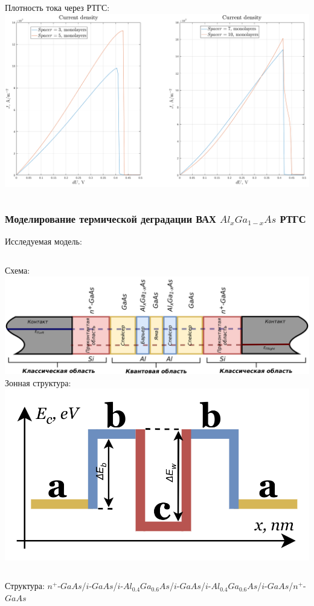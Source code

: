 \documentclass[10pt,pdf,hyperref={unicode},aspectratio={169}]{beamer}
\begin{document}
\begin{frame}
\begin{columns}
		{\color{red} Плотность тока через РТГС:}
	   	\includegraphics[width=.8\linewidth,center]{assets/qslqj}
	\end{columns}
\end{frame}

\begin{frame}
	\frametitle{Моделирование термической деградации ВАХ $Al_{x}Ga_{1-x}As$ РТГС}
	{\color{blue}\large Исследуемая модель:}
	\begin{columns}
		{\color{red} Схема:}
	   	\includegraphics[width=.99\linewidth,center]{assets/RTHSModelDiff}
		{\color{red} Зонная структура:}
	   	\includegraphics[width=.99\linewidth,center]{assets/BD}
	\end{columns}
{\color{red}Структура}: $n^{+}$-$GaAs$/$i$-$GaAs$/$i$-$Al_{0.4}Ga_{0.6}As$/$i$-$GaAs$/$i$-$Al_{0.4}Ga_{0.6}As$/$i$-$GaAs$/$n^{+}$-$GaAs$

\end{frame}
\end{document}
